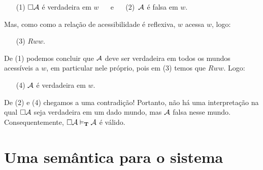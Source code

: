   \begin{itemize}
	\item[(1)]  $\Box \mathcal{A}$ é verdadeira em $w$   \,\,\,\,\,\,  e \,\,\,\,\,\,  (2)\, $\mathcal{A}$  é falsa em $w$.   
\end{itemize}
Mas, como como a relação de acessibilidade é reflexiva, $w$ acessa $w$, logo: 
\begin{itemize}
	\item[(3)]  $Rww$.
\end{itemize}
De (1) podemos concluir que $\mathcal{A}$ deve ser verdadeira em todos os mundos acessíveis a $w$, em particular nele próprio,  pois em (3) temos que $Rww$. Logo:
\begin{itemize}
	\item[(4)]   $\mathcal{A}$ é verdadeira em $w$.
\end{itemize}
De (2) e  (4) chegamos a uma contradição!  Portanto, não há uma interpretação  na qual $\Box\mathcal{A}$ seja verdadeira em um dado mundo, mas  $\mathcal{A}$  falsa nesse mundo. Consequentemente,   $\Box \mathcal{A}\vDash_{\mathbf{T}} \mathcal{A}$ é válido.



\section{Uma semântica para o sistema \mlSfour}
\label{SemanticsS4}

